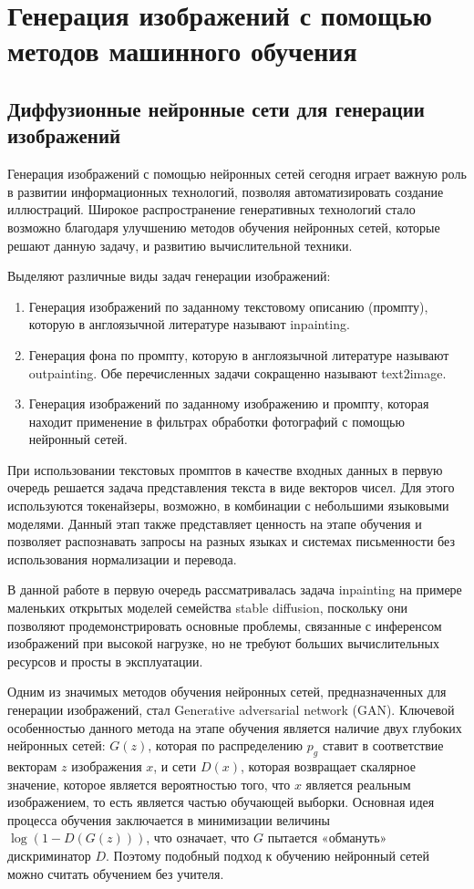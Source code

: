 \chapter{Генерация изображений с помощью методов машинного обучения}
\section{Диффузионные нейронные сети для генерации изображений}

Генерация изображений с помощью нейронных сетей сегодня играет важную роль в развитии
информационных технологий, позволяя автоматизировать создание иллюстраций.
Широкое распространение генеративных технологий стало возможно благодаря улучшению методов обучения нейронных
сетей, которые решают данную задачу, и развитию вычислительной техники.

Выделяют различные виды задач генерации изображений:
\begin{enumerate}
  \item Генерация изображений по заданному текстовому описанию (промпту), которую в англоязычной литературе называют inpainting.
  \item Генерация фона по промпту, которую в англоязычной литературе называют outpainting. Обе перечисленных
  задачи сокращенно называют text2image.
  \item Генерация изображений по заданному изображению и промпту, которая находит применение в фильтрах обработки фотографий с помощью нейронный сетей. 
\end{enumerate}

При использовании текстовых промптов в качестве входных данных в первую очередь решается задача представления текста в виде векторов
чисел. 
Для этого используются токенайзеры, возможно, в комбинации с небольшими языковыми моделями.
Данный этап также представляет ценность на этапе обучения и позволяет распознавать запросы на разных языках и системах
письменности без использования нормализации и перевода.

В данной работе в первую очередь рассматривалась задача inpainting на примере маленьких открытых моделей семейства
stable diffusion, поскольку они позволяют продемонстрировать основные проблемы, связанные с инференсом изображений
при высокой нагрузке, но не требуют больших вычислительных ресурсов и просты в эксплуатации.

Одним из значимых методов обучения нейронных сетей, предназначенных для генерации изображений, стал Generative adversarial network (GAN).
Ключевой особенностью данного метода на этапе обучения является наличие двух глубоких нейронных сетей: $G(z)$, которая по распределению $p_g$ ставит
в соответствие векторам $z$ изображения $x$, и сети $D(x)$, которая возвращает скалярное значение,
которое является вероятностью того, что $x$ является реальным изображением, то есть является частью
обучающей выборки. 
Основная идея процесса обучения заключается в минимизации величины $\log (1 - D(G(z)))$, что означает, что $G$ пытается «обмануть» дискриминатор $D$.
Поэтому подобный подход к обучению нейронный сетей можно считать обучением без учителя. 

